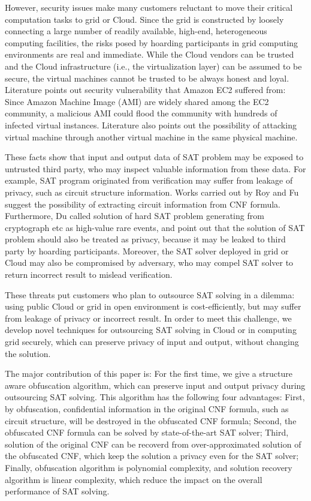 \documentclass[conference,compsocconf]{IEEEtran}
\begin{document}
However, security issues make many customers reluctant to move their critical computation tasks to grid or Cloud.
Since the grid is constructed by loosely connecting a large number of readily available, high-end, heterogeneous computing facilities\cite{Nordugrid},
the risks posed by hoarding participants in grid computing environments are real and immediate\cite{HV-grid}.
While the Cloud vendors can be trusted and the Cloud infrastructure (i.e., the virtualization layer) can be assumed to be secure,
the virtual machines cannot be trusted to be always honest and loyal.
Literature\cite{AMI} points out security vulnerability that Amazon EC2 suffered from: 
Since Amazon Machine Image (AMI) are widely shared among the EC2 community,
a malicious AMI could flood the community with hundreds of infected virtual instances.
Literature \cite{InformationLeakageofCloud} also points out
the possibility of attacking virtual machine
through another virtual machine in the same physical machine.

These facts show that input and output data of SAT problem may be exposed to untrusted third party,
who may inspect valuable information from these data.
For example, SAT program originated from verification may suffer from leakage of privacy, such as circuit structure information.
Works carried out by Roy\cite{csRoy} and Fu \cite{csFu} suggest the possibility of extracting circuit information from CNF formula.
Furthermore, Du\cite{HV-grid} called solution of hard SAT problem generating from cryptograph etc as high-value rare events, 
and point out that the solution of SAT problem should also be treated as privacy, 
because it may be leaked to third party by hoarding participants.
Moreover, the SAT solver deployed in grid or Cloud may also be compromised by adversary, 
who may compel SAT solver to return incorrect result to  mislead verification.

These threats put customers who plan to outsource SAT solving in a dilemma:
using public Cloud or grid in open environment is cost-efficiently, 
but may suffer from leakage of privacy or incorrect result.
In order to meet this challenge, we develop novel techniques for outsourcing SAT solving in Cloud or in computing grid securely, 
which can preserve privacy of input and output, without changing the solution.

The major contribution of this paper is:
For the first time, we give a structure aware obfuscation algorithm, 
which can preserve input and output privacy during outsourcing SAT solving.
This algorithm has the following four advantages:
First, by obfuscation, confidential information in the original CNF formula,
such as circuit structure,
will be destroyed in the obfuscated CNF formula;
Second, the obfuscated CNF formula can be solved by state-of-the-art SAT solver;
Third, solution of the original CNF can be recoverd from over-approximated solution of the obfuscated CNF,
which keep the solution a privacy even for the SAT solver;
Finally, obfuscation algorithm is  polynomial complexity,
and solution recovery algorithm is linear complexity,
which reduce the impact on the overall performance of SAT solving.
\end{document}

